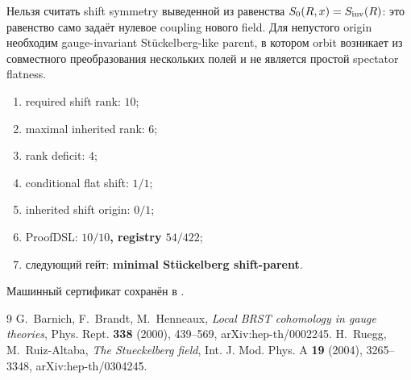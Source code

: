 \begin{nogocriterion}
Нельзя считать shift symmetry выведенной из равенства
$S_0(R,x)=S_{\rm inv}(R)$: это равенство само задаёт нулевое coupling нового
field. Для непустого origin необходим gauge-invariant Stückelberg-like
parent, в котором orbit возникает из совместного преобразования нескольких
полей и не является простой spectator flatness.
\end{nogocriterion}

\begin{protocol}\begin{enumerate}
\item required shift rank: \textbf{$10$};
\item maximal inherited rank: \textbf{$6$};
\item rank deficit: \textbf{$4$};
\item conditional flat shift: \textbf{$1/1$};
\item inherited shift origin: \textbf{$0/1$};
\item ProofDSL: \textbf{$10/10$, registry $54/422$};
\item следующий гейт: \textbf{minimal Stückelberg shift-parent}.
\end{enumerate}\end{protocol}

Машинный сертификат сохранён в
.

\begin{thebibliography}{9}
G.~Barnich, F.~Brandt, M.~Henneaux,
\emph{Local BRST cohomology in gauge theories},
Phys. Rept. \textbf{338} (2000), 439--569, arXiv:hep-th/0002245.
H.~Ruegg, M.~Ruiz-Altaba,
\emph{The Stueckelberg field},
Int. J. Mod. Phys. A \textbf{19} (2004), 3265--3348,
arXiv:hep-th/0304245.
\end{thebibliography}